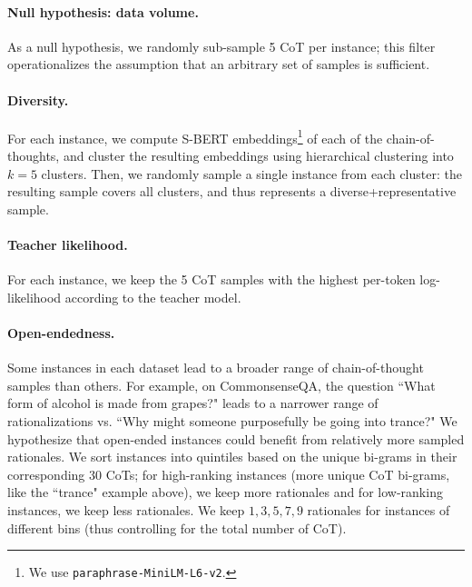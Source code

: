\documentclass[11pt]{article}
\begin{document}
\paragraph{Null hypothesis: data volume.} %
As a null hypothesis, we randomly sub-sample 5 CoT per instance; this filter operationalizes the assumption that an arbitrary set of samples is sufficient.


\paragraph{Diversity.} For each instance, we compute S-BERT \cite{reimers2019sentence} embeddings\footnote{We use \texttt{paraphrase-MiniLM-L6-v2}.} of each of the chain-of-thoughts, and cluster the resulting embeddings using hierarchical clustering into $k=5$ clusters. Then, we randomly sample a single instance from each cluster: the resulting sample covers all clusters, and thus represents a diverse+representative sample.

\paragraph{Teacher likelihood.} For each instance, we keep the 5 CoT samples with the highest per-token log-likelihood according to the teacher model.

\paragraph{Open-endedness.} Some instances in each dataset lead to a broader range of chain-of-thought samples than others. For example, on CommonsenseQA, the question ``What form of alcohol is made from grapes?" leads to a narrower range of rationalizations vs. ``Why might someone purposefully be going into trance?" 
We hypothesize that open-ended instances could benefit from relatively more sampled rationales.
We sort instances into quintiles based on the unique bi-grams in their corresponding 30 CoTs; for high-ranking instances (more unique CoT bi-grams, like the ``trance" example above), we keep more rationales and for low-ranking instances, we keep less rationales. We keep $1, 3, 5, 7, 9$ rationales for instances of different bins (thus controlling for the total number of CoT).
\end{document}
